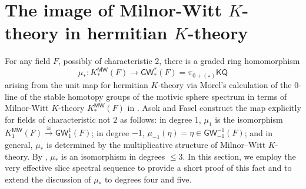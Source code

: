 \documentclass[11pt,hyp,english]{article}
\newcommand{\E}{\mathsf{E}}
\newcommand{\Z}{\mathbb{Z}}
\newcommand{\KQ}{\mathsf{KQ}}
\newcommand{\GW}{\mathsf{GW}}
\newcommand{\HZ}{\mathsf{M}\Z}
\newcommand{\cHZ}{\wt{{\mathsf{M}}}{\Z}}
\newcommand{\HWZ}{\mathsf{W}\Z}
\newcommand{\SH}{\mathbf{SH}}
\newcommand{\wt}[1]{\widetilde{#1}}
\newcommand{\s}{\mathsf{s}}
\newcommand{\MW}{{\mathsf{MW}}}
\newcommand{\bideg}{(\star)}
\theoremstyle{definition}
\begin{document}




\section{The image of Milnor-Witt $K$-theory in hermitian $K$-theory}
\label{section:tioMWKinhK}

For any field $F$, 
possibly of characteristic $2$, 
there is a graded ring homomorphism 
\[
\mu_*\colon K_*^{\MW}(F)\to\GW_*^{*}(F)=\pi_{0+\bideg}\KQ
\]
arising from the unit map for hermitian $K$-theory via Morel's calculation of the $0$-line of the stable 
homotopy groups of the motivic sphere spectrum in terms of Milnor-Witt $K$-theory $K_*^{\MW}(F)$ in \cite{MorelICM06}.
Asok and Fasel \cite[Theorem 4.1.2]{KO-map} construct the map explicitly for fields of characteristic not $2$ as follows: in degree $1$, $\mu_1$ is the isomorphism $K_1^{\MW}(F) \xrightarrow{\cong} \GW_1^{1}(F)$; in degree $-1$, $\mu_{-1}(\eta) = \eta \in \GW_{-1}^{-1}(F)$; and in general, $\mu_*$ is determined by the multiplicative structure of Milnor–Witt $K$-theory. By \cite[Lemma 4.1.6, Theorems 4.1.2, 4.3.1]{KO-map}, $\mu_*$ is an isomorphism in degrees $\le 3$. In this section, we employ the very effective slice spectral sequence to provide a short proof of this fact and to extend the discussion of $\mu_*$ to degrees four and five.
\end{document}
